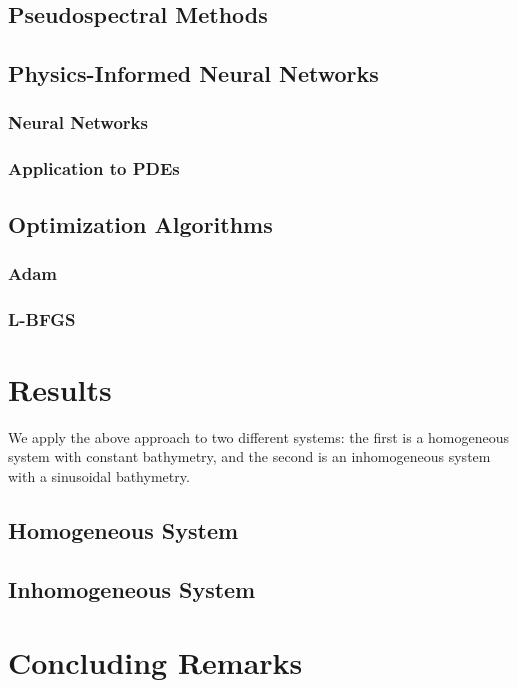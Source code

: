 \documentclass[letterpaper,12pt]{article}
\begin{document}
    \subsection{Pseudospectral Methods}\label{subsec:pseudospectral-methodology}
        

    \subsection{Physics-Informed Neural Networks}\label{subsec:pinn-methodology}
        \subsubsection{Neural Networks}
            
        \subsubsection{Application to PDEs}
            
            
    \subsection{Optimization Algorithms}
        
        \subsubsection{Adam}
            
        \subsubsection{L-BFGS}
            

    \section{Results}\label{sec:results}
    We apply the above approach to two different systems: the first is a homogeneous system with constant bathymetry,
    and the second is an inhomogeneous system with a sinusoidal bathymetry. 

    \subsection{Homogeneous System}\label{subsec:homogeneous-results}
        
    
    \subsection{Inhomogeneous System}\label{subsec:inhomogeneous-results}
        

    \section{Concluding Remarks}\label{sec:conclusion}
        

    \pagebreak

    
    

    \pagebreak
    \appendix
\end{document}
